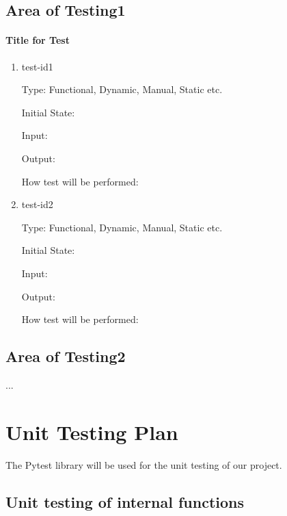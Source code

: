 \documentclass[12pt, titlepage]{article}
\begin{document}
\subsection{Area of Testing1}
		
\paragraph{Title for Test}

\begin{enumerate}

\item{test-id1\\}

Type: Functional, Dynamic, Manual, Static etc.
					
Initial State: 
					
Input: 
					
Output: 
					
How test will be performed: 
					
\item{test-id2\\}

Type: Functional, Dynamic, Manual, Static etc.
					
Initial State: 
					
Input: 
					
Output: 
					
How test will be performed: 

\end{enumerate}

\subsection{Area of Testing2}

...
	
\section{Unit Testing Plan}

The Pytest library will be used for the unit testing of our project.
		
\subsection{Unit testing of internal functions}
\end{document}
